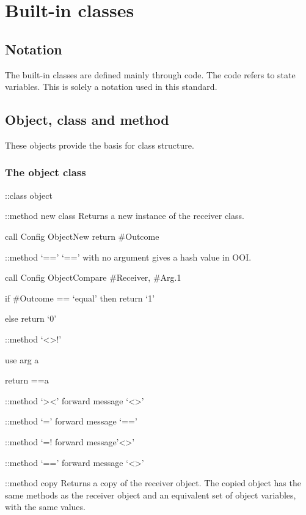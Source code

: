 \chapter{Built-in classes}\label{built-in-classes}

\section{Notation}\label{notation}

The built-in classes are defined mainly through code. The code refers to
state variables. This is solely a notation used in this standard.

\section{Object, class and method}\label{object-class-and-method}

These objects provide the basis for class structure.

\subsection{The object class}\label{the-object-class}

::class object

::method new class Returns a new instance of the receiver class.

call Config ObjectNew return \#Outcome

::method `==' `==' with no argument gives a hash value in OOI.

call Config ObjectCompare \#Receiver, \#Arg.1

if \#Outcome == `equal' then return `1'

else return `0'

::method `\textless\textgreater!'

use arg a

return \self==a

::method `\textgreater\textless{}' forward message
`\textless\textgreater{}'

::method `=' forward message `=='

::method `=! forward message'\textless\textgreater'

::method `==' forward message `\textless\textgreater{}'

::method copy Returns a copy of the receiver object. The copied object
has the same methods as the receiver object and an equivalent set of
object variables, with the same values.

